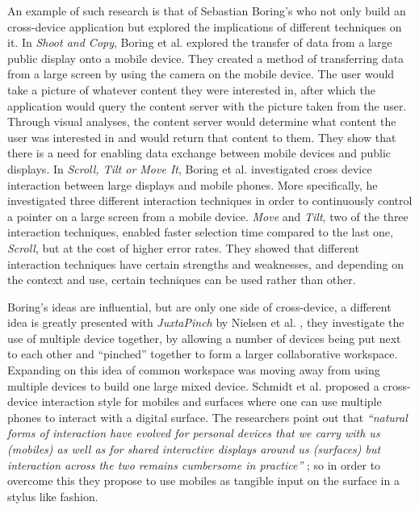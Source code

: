 An example of such research is that of Sebastian Boring's who not only build an cross-device application but explored the implications of different techniques on it. In \emph{Shoot and Copy}, Boring et al. \cite{Boring:2007} explored the transfer of data from a large public display onto a mobile device.
They created a method of transferring data from a large screen by using the camera on the mobile device.
The user would take a picture of whatever content they were interested in, after which the application would query the content server with the picture taken from the user.
Through visual analyses, the content server would determine what content the user was interested in and would return that content to them.
They show that there is a need for enabling data exchange between mobile devices and public displays.
In \emph{Scroll, Tilt or Move It}, Boring et al. \cite{Boring:2009} investigated cross device interaction between large displays and mobile phones.
More specifically, he investigated three different interaction techniques in order to continuously control a pointer on a large screen from a mobile device.
\emph{Move} and \emph{Tilt}, two of the three interaction techniques, enabled faster selection time compared to the last one, \emph{Scroll}, but at the cost of higher error rates.
They showed that different interaction techniques have certain strengths and weaknesses, and depending on the context and use, certain techniques can be used rather than other. 

Boring's ideas are influential, but are only one side of cross-device, a different idea is greatly presented with
\emph{JuxtaPinch} by Nielsen et al. \cite{Nielsen:2014}, they investigate the  use of multiple device together, by allowing a number of devices being put next to each other and ``pinched'' together to form a larger collaborative workspace.
Expanding on this idea of common workspace was moving away from using multiple devices to build one large mixed device. Schmidt et al. proposed a cross-device interaction style for mobiles and surfaces where one can use multiple phones to interact with a digital surface.
The researchers point out that \emph{``natural forms of interaction have evolved for personal devices that we carry with us (mobiles) as well as for shared interactive displays around us (surfaces) but interaction across the two remains cumbersome in practice''} \cite{Schmidt:2012}; so in order to overcome this they propose to use mobiles as tangible input on the surface in a stylus like fashion.

